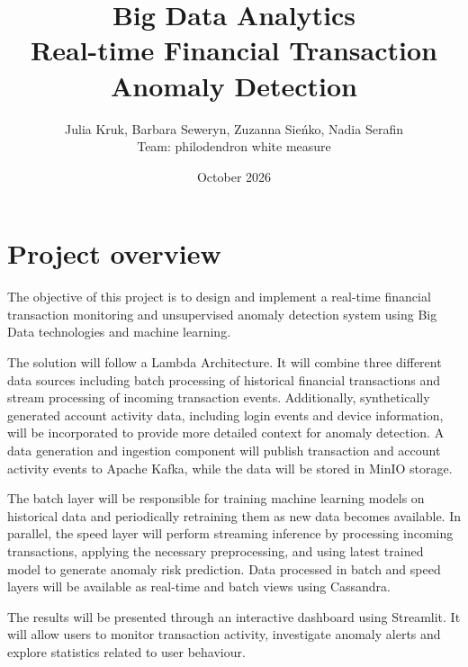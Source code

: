 \documentclass[titlepage]{article}
\title{
\Huge Big Data Analytics \\
\vspace{0.5em}
\Large Real-time Financial Transaction Anomaly Detection}
\author{
    Julia Kruk, Barbara Seweryn, Zuzanna Sieńko, Nadia Serafin \\
    \vspace{0.5em}
    \small Team: philodendron white measure \\
}
\date{October 2026}
\begin{document}
\maketitle

\tableofcontents

\newpage

\section{Project overview}
The objective of this project is to design and implement a real-time financial transaction monitoring and unsupervised anomaly detection system using Big Data technologies and machine learning.

The solution will follow a Lambda Architecture. It will combine three different data sources including batch processing of historical financial transactions and stream processing of incoming transaction events. Additionally, synthetically generated account activity data, including login events and device information, will be incorporated to provide more detailed context for anomaly detection. A data generation and ingestion component will publish transaction and account activity events to Apache Kafka, while the data will be stored in MinIO storage.

The batch layer will be responsible for training machine learning models on historical data and periodically retraining them as new data becomes available. In parallel, the speed layer will perform streaming inference by processing incoming transactions, applying the necessary preprocessing, and using latest trained model to generate anomaly risk prediction. Data processed in batch and speed layers will be available as real-time and batch views using Cassandra.

The results will be presented through an interactive dashboard using Streamlit. It will allow users to monitor transaction activity, investigate anomaly alerts and explore statistics related to user behaviour.
\end{document}
